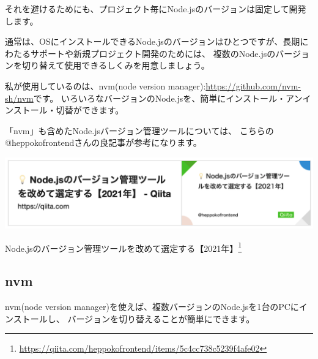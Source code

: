 \vspace*{\baselineskip}

それを避けるためにも、プロジェクト毎にNode.jsのバージョンは固定して開発します。

\vspace*{\baselineskip}

通常は、OSにインストールできるNode.jsのバージョンはひとつですが、長期にわたるサポートや新規プロジェクト開発のためには、
複数のNode.jsのバージョンを切り替えて使用できるしくみを用意しましょう。

\vspace*{\baselineskip}

私が使用しているのは、nvm(node version manager):\url{https://github.com/nvm-sh/nvm}です。
いろいろなバージョンのNode.jsを、簡単にインストール・アンインストール・切替ができます。

\vspace*{\baselineskip}

「nvm」も含めたNode.jsバージョン管理ツールについては、
こちらの@heppokofrontendさんの良記事が参考になります。

\begin{reviewimage}%
\includegraphics[width=1.0\maxwidth]{./images/01-createDevEnv/01_nodeVersionChange.png}%
\label{image:01-createDevEnv:01_nodeVersionChange}
\end{reviewimage}

Node.jsのバージョン管理ツールを改めて選定する【2021年】\footnote{\url{https://qiita.com/heppokofrontend/items/5c4cc738c5239f4afe02}}

\subsection{nvm}
\keeplastskip{
  \label{sec:1-1-3}
  \par\nobreak
}

nvm(node version manager)を使えば、複数バージョンのNode.jsを1台のPCにインストールし、
バージョンを切り替えることが簡単にできます。


